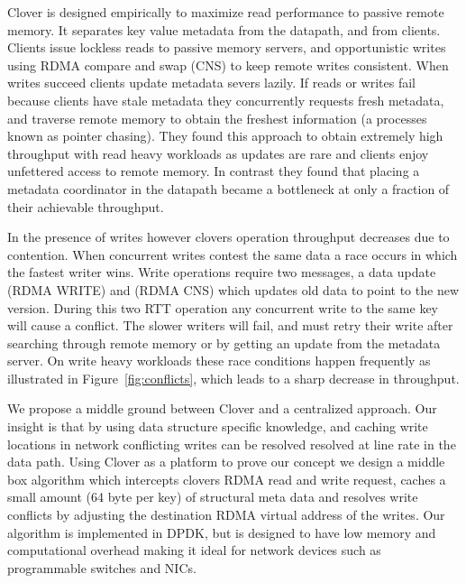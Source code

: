 
Clover is designed empirically to maximize read performance to passive
remote memory. It separates key value metadata from the datapath, and
from clients. Clients issue lockless reads to passive memory servers,
and opportunistic writes using RDMA compare and swap (CNS) to keep
remote writes consistent. When writes succeed clients update metadata
severs lazily. If reads or writes fail because clients have stale
metadata they concurrently requests fresh metadata, and traverse
remote memory to obtain the freshest information (a processes known as
pointer chasing). They found this approach to obtain extremely high
throughput with read heavy workloads as updates are rare and clients
enjoy unfettered access to remote memory. In contrast they found that
placing a metadata coordinator in the datapath became a bottleneck at
only a fraction of their achievable throughput.


In the presence of writes however clovers operation throughput
decreases due to contention. When concurrent writes contest the same
data a race occurs in which the fastest writer wins. Write operations
require two messages, a data update (RDMA WRITE) and (RDMA CNS) which
updates old data to point to the new version. During this two RTT
operation any concurrent write to the same key will cause a conflict.
The slower writers will fail, and must retry their write after
searching through remote memory or by getting an update from the
metadata server.  On write heavy workloads these race conditions
happen frequently as illustrated in Figure~\ref{fig:conflicts}, which
leads to a sharp decrease in throughput.

We propose a middle ground between Clover and a centralized approach.
Our insight is that by using data structure specific knowledge, and
caching write locations in network conflicting writes can be resolved
resolved at line rate in the data path.  Using Clover as a platform to
prove our concept we design a middle box algorithm which intercepts
clovers RDMA read and write request, caches a small amount (64 byte
per key) of structural meta data and resolves write conflicts by
adjusting the destination RDMA virtual address of the writes. Our
algorithm is implemented in DPDK, but is designed to have low memory
and computational overhead making it ideal for network devices such as
programmable switches and NICs.



